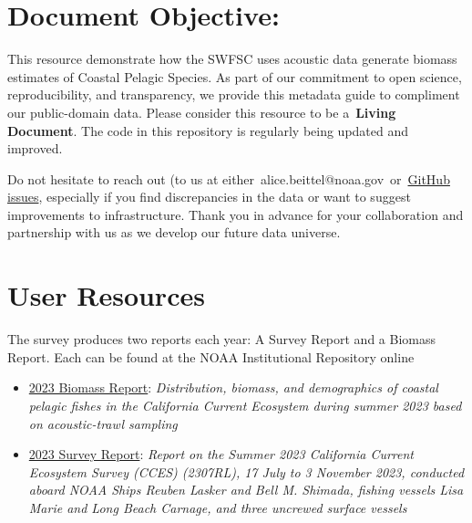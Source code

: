 \documentclass[
  letterpaper,
  oneside,
  open=any]{scrbook}
\begin{document}
\section*{Document Objective:}\label{document-objective}


This resource demonstrate how the SWFSC uses acoustic data generate
biomass estimates of Coastal Pelagic Species. As part of our commitment
to open science, reproducibility, and transparency, we provide this
metadata guide to compliment our public-domain data. Please consider
this resource to be a~\textbf{Living Document}. The code in this
repository is regularly being updated and improved.~

Do not hesitate to reach out (to us at
either~alice.beittel@noaa.gov~or~\href{https://github.com/nmfs-swfsc-ast/echo-class/issues}{GitHub
issues}, especially if you find discrepancies in the data or want to
suggest improvements to infrastructure. Thank you in advance for your
collaboration and partnership with us as we develop our future data
universe.

\section*{User Resources}\label{user-resources}


The survey produces two reports each year: A Survey Report and a Biomass
Report. Each can be found at the NOAA Institutional Repository online

\begin{itemize}
\item
  \href{https://repository.library.noaa.gov/view/noaa/61651}{2023
  Biomass Report}: \emph{Distribution, biomass, and demographics of
  coastal pelagic fishes in the California Current Ecosystem during
  summer 2023 based on acoustic-trawl sampling}
\item
  \href{https://repository.library.noaa.gov/view/noaa/61647}{2023 Survey
  Report}: \emph{Report on the Summer 2023 California Current Ecosystem
  Survey (CCES) (2307RL), 17 July to 3 November 2023, conducted aboard
  NOAA Ships Reuben Lasker and Bell M. Shimada, fishing vessels Lisa
  Marie and Long Beach Carnage, and three uncrewed surface vessels}
\end{itemize}
\end{document}
